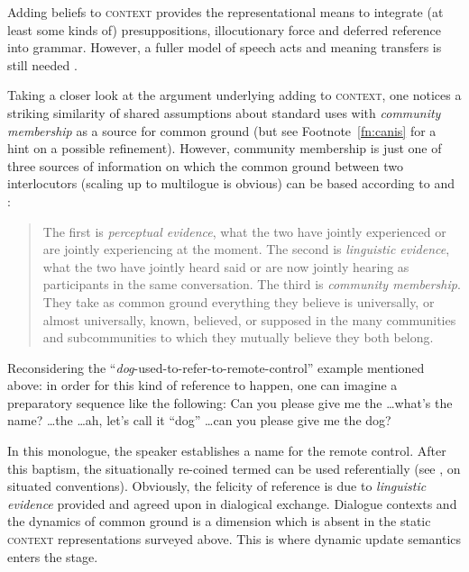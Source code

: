 \documentclass[output=paper]{langsci/langscibook}
\begin{document}
{Adding beliefs to \textsc{context} provides the representational means to integrate (at least some kinds of) presuppositions, illocutionary force and deferred reference \citep{Nunberg:1978} into grammar.
%
However, a fuller model of speech acts and meaning transfers is still needed \citep[]{Kathol:Przepiorkowski:Tseng:2011}. %


Taking a closer look at the argument underlying adding  to \textsc{context}, one notices a striking similarity of shared assumptions about standard uses with \emph{community membership}  as a source for common ground (but see Footnote~\ref{fn:canis} for a hint on a possible refinement).
%
However, community membership is just one of three sources of information on which the common ground between two interlocutors (scaling up to multilogue is obvious) can be based according to \citet{Clark:Marshall:1981} and \citet{Clark:Schreuder:Buttrick:1983}:
%
\begin{quote}
The first is \emph{perceptual evidence}, what the two have jointly experienced or are jointly experiencing at the moment. The second is \emph{linguistic evidence}, what the two have jointly heard said or are now jointly hearing as participants in the same conversation. The third is \emph{community membership}. They take as common ground everything they believe is universally, or almost universally, known, believed, or supposed in the many communities and subcommunities to which they mutually believe they both belong. \hfill \citep[]{Clark:Schreuder:Buttrick:1983} 
\end{quote}


Reconsidering the \enquote{\textit{dog}-used-to-refer-to-remote-control} example mentioned above: in order for this kind of reference to happen, one can imagine a preparatory sequence like the following:
%
\ea
Can you please give me the \ldots what's the name? \ldots the \ldots ah, let's call it \enquote{dog} \ldots can you please give me the dog?
\z

In this monologue, the speaker establishes a name for the remote control.
%
After this baptism, the situationally re-coined termed can be used referentially (see \citet{Luecking:Rieser:Staudacher:2006:b}, on situated conventions).
%
Obviously, the felicity of reference is due to \emph{linguistic evidence}  provided and agreed upon in dialogical exchange.
%
Dialogue contexts and the dynamics of common ground is a dimension which is absent in the static \textsc{context} representations surveyed above.
%
This is where dynamic update semantics enters the stage.




}
\end{document}
